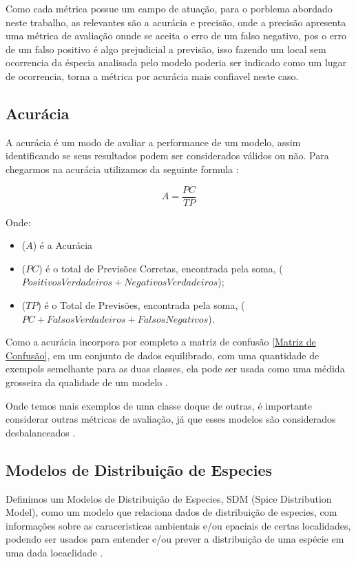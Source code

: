 \documentclass[
	12pt,				%
	openright,			%
	oneside,			%
	a4paper,			%
	english,			%
	brazil				%
	]{abntex2}
\begin{document}
Como cada métrica possue um campo de atuação, para o porblema abordado neste trabalho, as relevantes são a acurácia e precisão,
onde a precisão apresenta uma métrica de avaliação onnde se aceita o erro de um falso negativo, pos o erro de um falso positivo
é algo prejudicial a previsão, isso fazendo um local sem ocorrencia da éspecia analisada pelo modelo poderia ser indicado como 
um lugar de ocorrencia, torna a métrica por acurácia mais confiavel neste caso.

\subsection{Acurácia}

A acurácia é um modo de avaliar a performance de um modelo, assim identificando se seus resultados podem
ser considerados válidos ou não. Para chegarmos na acurácia utilizamos da seguinte formula \cite{conta_acuracia}:

\begin{equation}
	\label{conta_acuracia}
	A = \frac{PC}{TP}
\end{equation}

Onde:
\begin{itemize}
	\item ($A$) é a Acurácia
	\item ($PC$) é o total de Previsões Corretas, encontrada pela soma, ($Positivos Verdadeiros + Negativos Verdadeiros$);
	\item ($TP$) é o Total de Previsões, encontrada pela soma, ($PC + Falsos Verdadeiros + Falsos Negativos$).
\end{itemize}

Como a acurácia incorpora por completo a matriz de confusão \ref{Matriz de Confusão}, em um conjunto de dados equilibrado, 
com uma quantidade de exempols semelhante para as duas classes, ela pode ser usada como uma médida grosseira da qualidade 
de um modelo \cite{acuracia_matriz}.

Onde temos mais exemplos de uma classe doque de outras, é importante considerar outras métricas de avaliação, já que esses
modelos são considerados desbalanceados \cite{acuracia}.

\subsection{Modelos de Distribuição de Especies}

Definimos um Modelos de Distribuição de Especies, SDM (Spice Distribution Model), como um modelo que relaciona dados de 
distribuição de especies, com informações sobre as caraceristicas ambientais e/ou epaciais de certas localidades, podendo 
ser usados para entender e/ou prever a distribuição de uma espécie em uma dada locaclidade \cite{speciesDistributionModels}.
\end{document}
